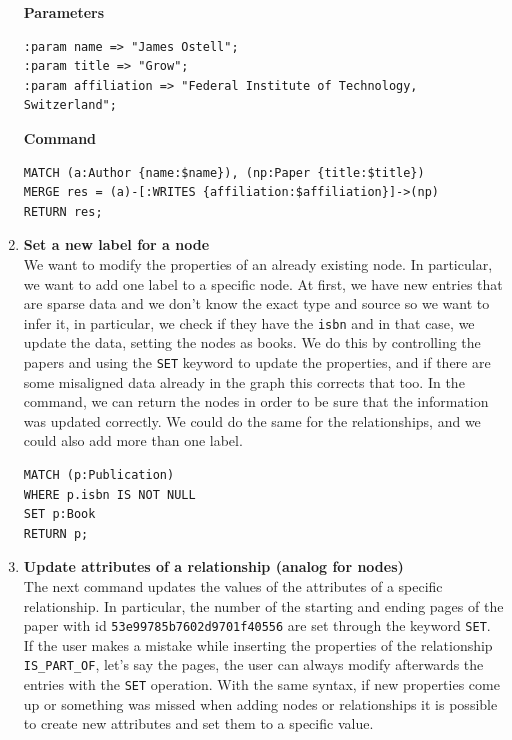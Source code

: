 \begin{enumerate}
    \textbf{Parameters}
    \begin{lstlisting}[label={lst:parameters_command2neo4j}]
:param name => "James Ostell";
:param title => "Grow";
:param affiliation => "Federal Institute of Technology, Switzerland";
    \end{lstlisting}
    \textbf{Command}
    \begin{lstlisting}[label={lst:command2neo4j}]
MATCH (a:Author {name:$name}), (np:Paper {title:$title})
MERGE res = (a)-[:WRITES {affiliation:$affiliation}]->(np)
RETURN res;
    \end{lstlisting}
    \item \textbf{Set a new label for a node} \\
    We want to modify the properties of an already existing node.
    In particular, we want to add one label to a specific node.
    At first, we have new entries that are sparse data and we don’t know the exact type and source so we want to infer it, in particular, we check if they have the \verb|isbn| and in that case, we update the data, setting the nodes as books.
    We do this by controlling the papers and using the \verb|SET| keyword to update the properties, and if there are some misaligned data already in the graph this corrects that too.
    In the command, we can return the nodes in order to be sure that the information was updated correctly.
    We could do the same for the relationships, and we could also add more than one label.
    \begin{lstlisting}[label={lst:command3neo4j}]
MATCH (p:Publication)
WHERE p.isbn IS NOT NULL
SET p:Book
RETURN p;
    \end{lstlisting}
    \item \textbf{Update attributes of a relationship (analog for nodes)} \\
    The next command updates the values of the attributes of a specific relationship.
    In particular, the number of the starting and ending pages of the paper with id \verb|53e99785b7602d9701f40556| are set through the keyword \verb|SET|.
    If the user makes a mistake while inserting the properties of the relationship \verb|IS_PART_OF|, let's say the pages, the user can always modify afterwards the entries with the \verb|SET| operation.
    With the same syntax, if new properties come up or something was missed when adding nodes or relationships it is possible to create new attributes and set them to a specific value.


\end{enumerate}
